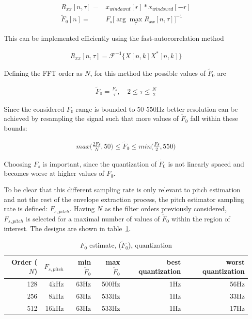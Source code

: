 \documentclass [11pt, proquest,oneside] {ganter_thesis}[2015/03/03]
\begin{document}
\begin{align}
R_{xx}[n,\tau] =& x_{windowed}[r] * x_{windowed}[-r] \\
\tilde{F}_0[n] =& F_s \Bigg[ \arg\max_\tau R_{xx}[n,\tau] \Bigg]^{-1}
\end{align}

This can be implemented efficiently using the fast-autocorrelation method

\begin{align}
R_{xx}[n,\tau] = \mathcal{F}^{-1}\Big\{X[n,k]X^*[n,k]\Big\}
\end{align}

Defining the FFT order as $N$, for this method the possible values of $\tilde{F}_0$ are 

\begin{align}
\tilde{F}_0 = \frac{F_s}{\tau}, \quad 2 \leq \tau \leq \frac{N}{2}
\end{align}

Since the considered $F_0$ range is bounded to 50-550Hz better resolution can be achieved by resampling the signal such that more values of $\tilde{F}_0$ fall within these bounds:

\begin{align}
max\Big(\frac{2Fs}{N}, 50\Big) \leq \tilde{F}_0 \leq min\Big(\frac{Fs}{2}, 550\Big)
\end{align}

Choosing $F_s$ is important, since the quantization of $\tilde{F}_0$ is not linearly spaced and becomes worse at higher values of $F_0$.

To be clear that this different sampling rate is only relevant to pitch estimation and not the rest of the envelope extraction process, the pitch estimator sampling rate is defined: $F_{s,pitch}$.  Having $N$ as the filter orders previously considered, $F_{s,pitch}$ is selected for a maximal number of values of $\tilde{F}_0$ within the region of interest.  The designs are shown in table~\ref{table:f0_quantization}.

\begin{table}
\begin{center}
\begin{tabular}{| r | r | r | r | r | r |}
  \hline
  \textbf{Order ($N$)} & \textbf{$F_{s,pitch}$} &  \textbf{min $\tilde{F}_0$} & \textbf{max $\tilde{F}_0$} &  \textbf{best quantization} &  \textbf{worst quantization} \\ \hline
  128 & 4kHz & 63Hz & 500Hz & 1Hz & 56Hz \\ \hline
  256 & 8kHz & 63Hz & 533Hz & 1Hz & 33Hz \\ \hline
  512 & 16kHz & 63Hz & 533Hz & 1Hz & 17Hz \\ \hline
\end{tabular}
\end{center}
\caption{$F_0$ estimate, ($\tilde{F}_0$), quantization}\label{table:f0_quantization}
\end{table}
\end{document}
